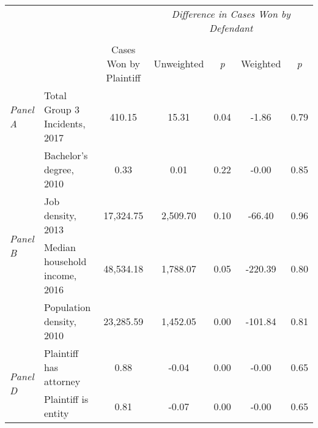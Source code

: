 \begin{tabular}{llccccc}
\toprule
 &  & \textit{} & \multicolumn{4}{c}{\textit{Difference in Cases Won by Defendant}} \\
\cline{4-7}
\\
 &  & Cases Won by Plaintiff & Unweighted & \emph{p} & Weighted & \emph{p} \\
\midrule
\textit{Panel A} & Total Group 3 Incidents, 2017 & 410.15 & 15.31 & 0.04 & -1.86 & 0.79 \\
\cline{1-7}
\multirow[c]{4}{3cm}{\textit{Panel B}} & Bachelor's degree, 2010 & 0.33 & 0.01 & 0.22 & -0.00 & 0.85 \\
 & Job density, 2013 & 17,324.75 & 2,509.70 & 0.10 & -66.40 & 0.96 \\
 & Median household income, 2016 & 48,534.18 & 1,788.07 & 0.05 & -220.39 & 0.80 \\
 & Population density, 2010 & 23,285.59 & 1,452.05 & 0.00 & -101.84 & 0.81 \\
\cline{1-7}
\multirow[c]{2}{3cm}{\textit{Panel D}} & Plaintiff has attorney & 0.88 & -0.04 & 0.00 & -0.00 & 0.65 \\
 & Plaintiff is entity & 0.81 & -0.07 & 0.00 & -0.00 & 0.65 \\
\cline{1-7}
\bottomrule
\end{tabular}
